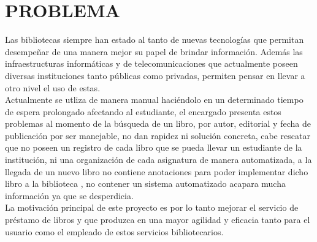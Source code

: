 \section{PROBLEMA} 

\begin{enumerate}[1.]
    
    Las bibliotecas siempre han estado al tanto de nuevas tecnologías que permitan desempeñar de una manera mejor su papel de brindar información. Además las infraestructuras informáticas y de telecomunicaciones que actualmente poseen diversas instituciones tanto públicas como privadas, permiten pensar en llevar a otro nivel el uso de estas.
    \\ Actualmente se utliza de manera manual haciéndolo en un determinado tiempo de espera prolongado afectando al estudiante, el encargado presenta estos problemas al momento de la búsqueda de un libro, por autor, editorial y fecha de publicación por ser manejable, no dan rapidez ni solución concreta, cabe rescatar que no poseen un registro de cada libro que se pueda llevar un estudiante de la institución, ni una organización de cada asignatura de manera automatizada, a la llegada de un nuevo libro no contiene anotaciones para poder implementar dicho libro a la biblioteca , no contener un sistema automatizado acapara mucha información ya que se desperdicia.
\\ La motivación principal de este proyecto es por lo tanto mejorar el servicio de préstamo de libros y que produzca en una mayor agilidad y eficacia tanto para el usuario como el empleado de estos servicios bibliotecarios.


\end{enumerate} 
